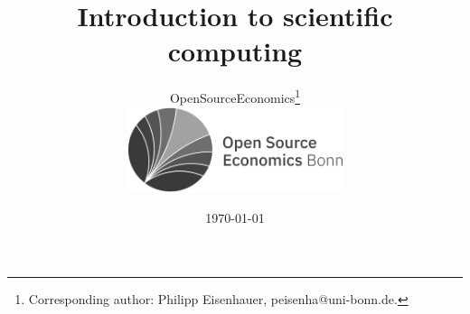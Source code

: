 \title{Introduction to scientific computing  \vspace{-0.1cm}}
\author{OpenSourceEconomics\thanks{Corresponding author: Philipp Eisenhauer, peisenha@uni-bonn.de.} \\
 \includegraphics[height=2.5cm]{material/OSE_bonn_mdli_bw.pdf} \vspace{-0.1cm}}
\date{\today}
